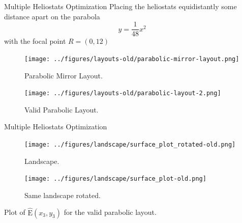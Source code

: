 \documentclass[10pt, xcolor={dvipsnames}]{beamer}
\begin{document}
\begin{frame}{Multiple Heliostats Optimization}
Placing the heliostats equidistantly some distance apart on the parabola
\begin{equation}
y = \frac{1}{48} x^{2}
\end{equation}
with the focal point $R = (0, 12)$
\begin{minipage}[t]{0.5\textwidth}
\begin{center}
\begin{figure}
\texttt{[image: ../figures/layouts-old/parabolic-mirror-layout.png]}
\caption{Parabolic Mirror Layout.}
\end{figure}
\end{center}
\end{minipage}%
\begin{minipage}[t]{0.5\textwidth}
\begin{center}
\begin{figure}
\texttt{[image: ../figures/layouts-old/parabolic-layout-2.png]}
\caption{Valid Parabolic Layout.}
\end{figure}
\end{center}
\end{minipage}
\end{frame}

\begin{frame}{Multiple Heliostats Optimization}
\begin{minipage}[t]{0.5\textwidth}
\begin{center}
\begin{figure}
\texttt{[image: ../figures/landscape/surface\_plot\_rotated-old.png]}
\caption{Landscape.}
\end{figure}
\end{center}
\end{minipage}%
\begin{minipage}[t]{0.5\textwidth}
\begin{center}
\vspace{-.5cm}
\begin{figure}
\texttt{[image: ../figures/landscape/surface\_plot-old.png]}
\caption{Same landscape rotated.}
\end{figure}
\end{center}
\end{minipage}
\begin{center}
Plot of $\widehat{\text{E}}(x_3, y_3)$ for the valid parabolic layout.
\end{center}
\end{frame}
\end{document}
